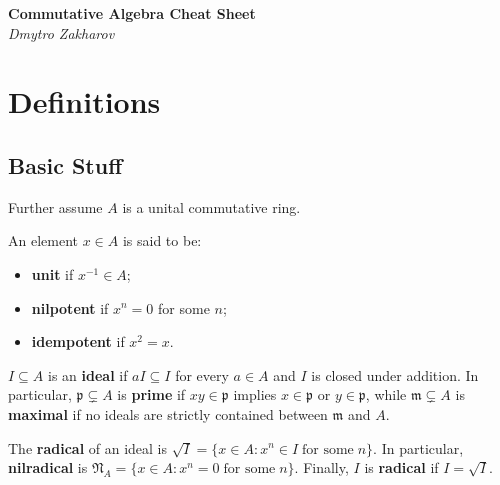 \documentclass{template}
\begin{document}
\begin{center}
    \Large \textcolor{blue!70!black}{\textbf{Commutative Algebra Cheat Sheet}} \\
    \normalsize \textit{Dmytro Zakharov}
\end{center}

\tableofcontents

\newpage

\section{Definitions}

\subsection{Basic Stuff}

Further assume $A$ is a unital commutative ring.

\begin{definition}
    An element $x \in A$ is said to be:
    \begin{itemize}
        \item \textbf{unit} if $x^{-1} \in A$;
        \item \textbf{nilpotent} if $x^n = 0$ for some $n$;
        \item \textbf{idempotent} if $x^2 = x$.
    \end{itemize}
\end{definition}

\begin{definition}
    $I \subseteq A$ is an \textbf{ideal} if $aI \subseteq I$ for every $a \in A$
    and $I$ is closed under addition. In particular, $\mathfrak{p} \subsetneq A$
    is \textbf{prime} if $xy \in \mathfrak{p}$ implies $x \in \mathfrak{p}$ or
    $y \in \mathfrak{p}$, while $\mathfrak{m} \subsetneq A$ is \textbf{maximal}
    if no ideals are strictly contained between $\mathfrak{m}$ and $A$. 
\end{definition}

\begin{definition}
    The \textbf{radical} of an ideal is $\sqrt{I} = \{x \in A: x^n \in I \;
    \text{for some} \; n\}$. In particular, \textbf{nilradical} is $\mathfrak{N}_A = \{x
    \in A: x^n = 0 \; \text{for some} \; n\}$. Finally, $I$ is \textbf{radical}
    if $I = \sqrt{I}$.
\end{definition}
\end{document}
